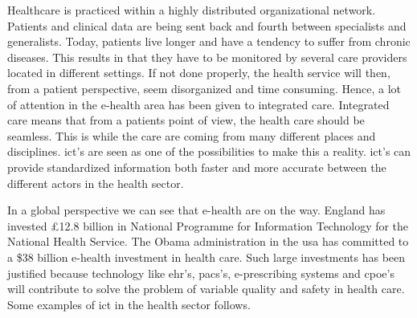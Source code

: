 Healthcare is practiced within a highly distributed organizational network.
Patients and clinical data are being sent back and fourth between specialists and generalists.
Today, patients live longer and have a tendency to suffer from chronic diseases. 
This results in that they have to be monitored by several care providers located in different settings.
If not done properly, the health service will then, from a patient perspective, seem disorganized and time consuming.
Hence, a lot of attention in the e-health area has been given to integrated care. 
Integrated care means that from a patients point of view, the health care should be seamless. 
This is while the care are coming from many different places and disciplines. 
\gls{ict}'s are seen as one of the possibilities to make this a reality. 
\gls{ict}'s can provide standardized information both faster and more accurate between the different actors in the health sector.

In a global perspective we can see that e-health are on the way.
England has invested £12.8 billion in National Programme for Information Technology for the National Health Service.
The Obama administration in the \gls{usa} has committed to a \$38 billion e-health investment in health care.
Such large investments has been justified because technology like \gls{ehr}'s, \gls{pacs}'s, e-prescribing systems and \gls{cpoe}'s will contribute to solve the problem of variable quality and safety in health care. Some examples of \gls{ict} in the health sector follows.

\cite{ictcare:winther}
\cite{ehealth:blaya}
\cite{ehealth:ashly}

\newpage

